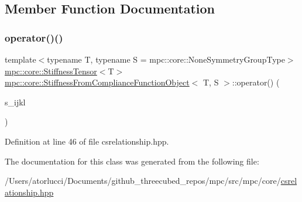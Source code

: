\subsection{Member Function Documentation}
\mbox{\label{structmpc_1_1core_1_1_stiffness_from_compliance_function_object_addf243fde9b4ad271c7ab37bedea199c}} 
\subsubsection{\texorpdfstring{operator()()}{operator()()}}
{\footnotesize\ttfamily template$<$typename T, typename S = mpc\+::core\+::\+None\+Symmetry\+Group\+Type$>$ \\
\mbox{\hyperlink{structmpc_1_1core_1_1_stiffness_tensor}{mpc\+::core\+::\+Stiffness\+Tensor}}$<$T$>$ \mbox{\hyperlink{structmpc_1_1core_1_1_stiffness_from_compliance_function_object}{mpc\+::core\+::\+Stiffness\+From\+Compliance\+Function\+Object}}$<$ T, S $>$\+::operator() (\begin{DoxyParamCaption}\item[{const \mbox{\hyperlink{structmpc_1_1core_1_1_compliance_tensor}{mpc\+::core\+::\+Compliance\+Tensor}}$<$ T $>$ \&}]{s\+\_\+ijkl }\end{DoxyParamCaption})\hspace{0.3cm}{\ttfamily [inline]}}



Definition at line 46 of file csrelationship.\+hpp.



The documentation for this class was generated from the following file\+:\begin{DoxyCompactItemize}
\item 
/\+Users/atorlucci/\+Documents/github\+\_\+threecubed\+\_\+repos/mpc/src/mpc/core/\mbox{\hyperlink{csrelationship_8hpp}{csrelationship.\+hpp}}\end{DoxyCompactItemize}
